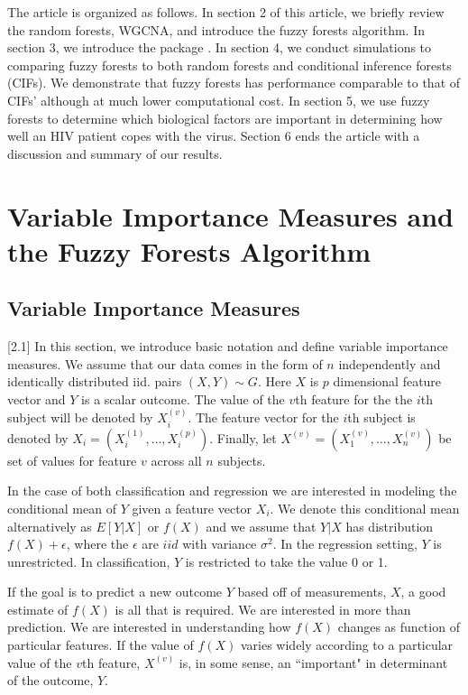 \documentclass[article,shortnames]{jss}
\begin{document}
The article is organized as follows.  In section 2 of this article, we briefly review the random forests, WGCNA, and introduce the fuzzy forests algorithm.
In section 3, we introduce the  package .  In section 4, we conduct simulations to comparing fuzzy forests to both random forests and conditional inference forests (CIFs).  We demonstrate that fuzzy forests has performance comparable to that of CIFs' although at much lower computational cost.  In section 5, we use fuzzy forests to determine which biological factors are important in determining how well an HIV patient copes with the virus.  Section 6 ends the article with a discussion and summary of our results. 

\section{Variable Importance Measures and the Fuzzy Forests Algorithm}
\subsection{Variable Importance Measures}[2.1]
In this section, we introduce basic notation and define variable importance measures.  We assume that our data comes in the form of $n$ independently and identically distributed iid.
pairs $(X,Y) \sim G$.  Here $X$ is $p$ dimensional feature vector and $Y$ is a scalar outcome.  The value of the $v$th feature for the the $i$th subject will be denoted by $X_{i}^{(v)}$.
The feature vector for the $i$th subject is denoted by $X_{i}=(X_{i}^{(1)},\ldots,X_{i}^{(p)})$.   Finally, let $X^{(v)}=(X_{1}^{(v)},\ldots,X_{n}^{(v)})$ be set of values for feature $v$ across
all $n$ subjects.

In the case of both classification and regression we are interested in modeling the conditional mean of $Y$ given a feature vector $X_{i}$.  We denote this conditional mean alternatively as $E[Y|X]$ or $f(X)$ and we assume that $Y|X$ has distribution $f(X) + \epsilon$, where the $\epsilon$ are $iid$ with variance $\sigma^{2}$.   In the regression setting, $Y$ is unrestricted. 
In classification, $Y$ is restricted to take the value 0 or 1.  

If the goal is to predict a new outcome $Y$ based off of measurements, $X$, a good estimate of $f(X)$ is all that is required.
We are interested in more than prediction.  We are interested in understanding how $f(X)$ changes as function of particular features. 
If the value of $f(X)$ varies widely according to a particular value of the $v$th feature, $X^{(v)}$ is, in some sense, an ``important" in determinant of
the outcome, $Y$.  
\end{document}
